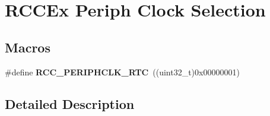 \hypertarget{group___r_c_c_ex___periph___clock___selection}{\section{R\-C\-C\-Ex Periph Clock Selection}
\label{group___r_c_c_ex___periph___clock___selection}
}
\subsection*{Macros}
\begin{DoxyCompactItemize}
\item 
\hypertarget{group___r_c_c_ex___periph___clock___selection_gaede03aaafb5319bb39767bf50182406f}{\#define {\bfseries R\-C\-C\-\_\-\-P\-E\-R\-I\-P\-H\-C\-L\-K\-\_\-\-R\-T\-C}~((uint32\-\_\-t)0x00000001)}\label{group___r_c_c_ex___periph___clock___selection_gaede03aaafb5319bb39767bf50182406f}

\end{DoxyCompactItemize}


\subsection{Detailed Description}
